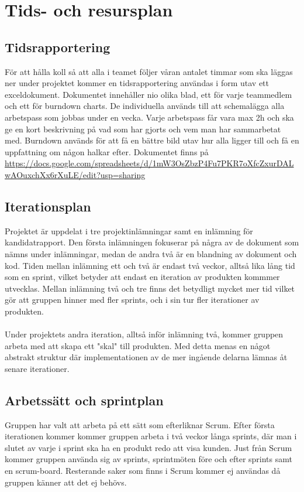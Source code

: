 \section{Tids- och resursplan}

\subsection{Tidsrapportering}
För att hålla koll så att alla i teamet följer våran antalet timmar som ska läggas ner under
projektet kommer en tidsrapportering användas i form utav ett exceldokument. Dokumentet
innehåller nio olika blad, ett för varje teammedlem och ett för burndown charts.
De individuella används till att schemalägga alla arbetspass som jobbas under en vecka.
Varje arbetspass får vara max 2h och ska ge en kort beskrivning på vad som har gjorts och vem
man har sammarbetat med. Burndown används för att få en bättre bild utav hur alla ligger till
och få en uppfattning om någon halkar efter.
Dokumentet finns på \url{https://docs.google.com/spreadsheets/d/1mW3OsZbzP4Fu7PKR7oXfcZxurDALwAOuxchXx6rXuLE/edit?usp=sharing}


\subsection{Iterationsplan}
Projektet är uppdelat i tre projektinlämningar samt en inlämning för kandidatrapport. Den första inlämningen fokuserar på några av de dokument som nämns under inlämningar, medan de andra två är en blandning av dokument och kod. Tiden mellan inlämning ett och två är endast två veckor, alltså lika lång tid som en sprint, vilket betyder att endast en iteration av produkten kommmer utvecklas. Mellan inlämning två och tre finns det betydligt mycket mer tid vilket gör att gruppen hinner med fler sprints, och i sin tur fler iterationer av produkten.\\
\\
Under projektets andra iteration, alltså inför inlämning två, kommer gruppen arbeta med att skapa ett "skal" till produkten. Med detta menas en något abstrakt struktur där implementationen av de mer ingående delarna lämnas åt senare iterationer.

\subsection{Arbetssätt och sprintplan}
Gruppen har valt att arbeta på ett sätt som efterliknar Scrum. Efter första iterationen kommer kommer gruppen arbeta i två veckor långa sprints, där man i slutet av varje i sprint ska ha en produkt redo att visa kunden. Just från Scrum kommer gruppen använda sig av sprints, sprintmöten före och efter sprints samt en scrum-board. Resterande saker som finns i Scrum kommer ej användas då gruppen känner att det ej behövs.

